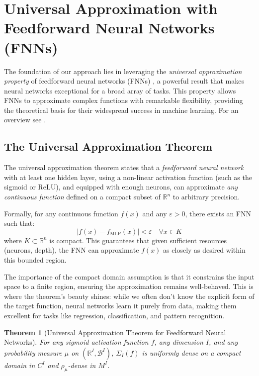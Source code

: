 \documentclass{article}
\newtheorem{theorem}{Theorem}
\theoremstyle{definition} \newtheorem{definition}{Definition}
\theoremstyle{remark} \newtheorem{remark}{Remark}
\newcounter{ct}
\begin{document}
\section{Universal Approximation with Feedforward Neural Networks (FNNs)}\label{sec:uniapproxffn}

The foundation of our approach lies in leveraging the \textit{universal approximation property} of feedforward neural networks (FNNs) \citep{poggio1990networks}, a powerful result that makes neural networks exceptional for a broad array of tasks. This property allows FNNs to approximate complex functions with remarkable flexibility, providing the theoretical basis for their widespread success in machine learning.
For an overview see \citep{blum1991approximation,scarselli1998universal,augustine2024survey}.





\subsection{The Universal Approximation Theorem}
The universal approximation theorem states that a \textit{feedforward neural network} with at least one hidden layer, using a non-linear activation function (such as the sigmoid or ReLU), and equipped with enough neurons, can approximate \textit{any continuous function} defined on a compact subset of \(\mathbb{R}^n\) to arbitrary precision.

Formally, for any continuous function \(f(x)\) and any \(\varepsilon > 0\), there exists an FNN such that:
\[
| f(x) - f_{\text{MLP}}(x) | < \varepsilon \quad \forall x \in K
\]
where \(K \subset \mathbb{R}^n\) is compact. This guarantees that given sufficient resources (neurons, depth), the FNN can approximate \(f(x)\) as closely as desired within this bounded region.

The importance of the compact domain assumption is that it constrains the input space to a finite region, ensuring the approximation remains well-behaved.	
This is where the theorem’s beauty shines: while we often don’t know the explicit form of the target function, neural networks learn it purely from data, making them excellent for tasks like regression, classification, and pattern recognition.

 
 \begin{theorem}[Universal Approximation Theorem for Feedforward Neural Networks\citep{hornik1989multilayer,schafer2007uap}]
For any sigmoid activation function \( f \), any dimension \( I \), and any probability measure \( \mu \) on \( (\mathbb{R}^I, \mathcal{B}^I) \), \( \Sigma_I(f) \) is uniformly dense on a compact domain in \( C^I \) and \( \rho_{\mu} \)-dense in \( M^I \).
\end{theorem}
\end{document}
